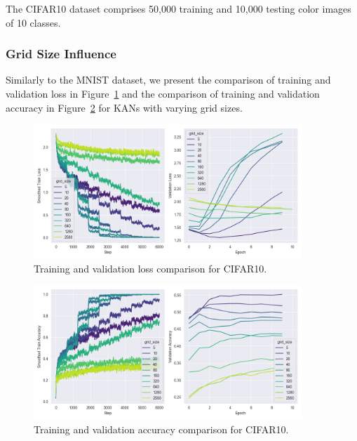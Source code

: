 \documentclass{article}
\begin{document}
The CIFAR10 dataset comprises 50,000 training and 10,000 testing color images of 10 classes.

\subsubsection{Grid Size Influence}\label{subsubsec:grid-size-influence-cifar10}

Similarly to the MNIST dataset, we present the comparison of training and validation loss in Figure~\ref{fig:cifar10_loss_grid_size}
and the comparison of training and validation accuracy in Figure~\ref{fig:cifar10_accuracy_grid_size} for KANs with varying grid sizes.

\begin{figure}[H]
    \centering
    \includegraphics[width=0.9\textwidth]{pics/cifar10_loss_grid_size}
    \caption{Training and validation loss comparison for CIFAR10.}
    \label{fig:cifar10_loss_grid_size}
\end{figure}

\begin{figure}[H]
    \centering
    \includegraphics[width=0.9\textwidth]{pics/cifar10_accuracy_grid_size}
    \caption{Training and validation accuracy comparison for CIFAR10.}
    \label{fig:cifar10_accuracy_grid_size}
\end{figure}
\end{document}
